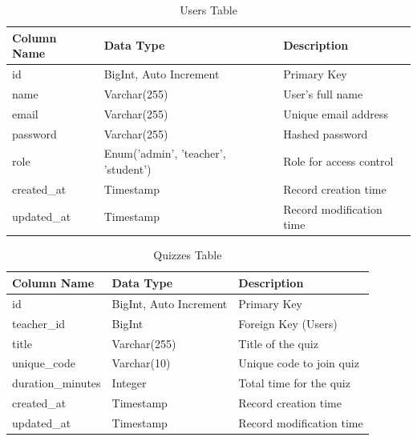 \begin{table}[H]
    \centering
    \begin{tabular}{|l|l|l|}
        \hline
        \textbf{Column Name} & \textbf{Data Type} & \textbf{Description} \\
        \hline
        id & BigInt, Auto Increment & Primary Key \\
        name & Varchar(255) & User's full name \\
        email & Varchar(255) & Unique email address \\
        password & Varchar(255) & Hashed password \\
        role & Enum('admin', 'teacher', 'student') & Role for access control \\
        created\_at & Timestamp & Record creation time \\
        updated\_at & Timestamp & Record modification time \\
        \hline
    \end{tabular}
    \caption{Users Table}
    \label{tab:users}
\end{table}

\begin{table}[H]
    \centering
    \begin{tabular}{|l|l|l|}
        \hline
        \textbf{Column Name} & \textbf{Data Type} & \textbf{Description} \\
        \hline
        id & BigInt, Auto Increment & Primary Key \\
        teacher\_id & BigInt & Foreign Key (Users) \\
        title & Varchar(255) & Title of the quiz \\
        unique\_code & Varchar(10) & Unique code to join quiz \\
        duration\_minutes & Integer & Total time for the quiz \\
        created\_at & Timestamp & Record creation time \\
        updated\_at & Timestamp & Record modification time \\
        \hline
    \end{tabular}
    \caption{Quizzes Table}
    \label{tab:quizzes}
\end{table}

